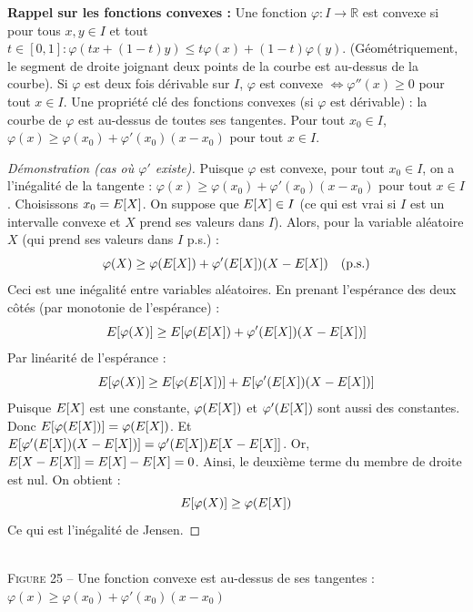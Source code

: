 \textbf{Rappel sur les fonctions convexes :} Une fonction $\varphi : I \to \mathbb{R}$ est convexe si pour tous $x, y \in I$ et tout $t \in [0, 1] : \varphi(tx + (1-t)y) \le t\varphi(x) + (1-t)\varphi(y)$. (Géométriquement, le segment de droite joignant deux points de la courbe est au-dessus de la courbe). Si $\varphi$ est deux fois dérivable sur $I$, $\varphi$ est convexe $\iff \varphi''(x) \ge 0$ pour tout $x \in I$. Une propriété clé des fonctions convexes (si $\varphi$ est dérivable) : la courbe de $\varphi$ est au-dessus de toutes ses tangentes. Pour tout $x_0 \in I$, $\varphi(x) \ge \varphi(x_0) + \varphi'(x_0)(x - x_0)$ pour tout $x \in I$.

\begin{proof}[Démonstration (cas où $\varphi'$ existe)]
Puisque $\varphi$ est convexe, pour tout $x_0 \in I$, on a l'inégalité de la tangente : $\varphi(x) \ge \varphi(x_0) + \varphi'(x_0)(x - x_0)$ pour tout $x \in I$. Choisissons $x_0 = E[X]$. On suppose que $E[X] \in I$ (ce qui est vrai si $I$ est un intervalle convexe et $X$ prend ses valeurs dans $I$). Alors, pour la variable aléatoire $X$ (qui prend ses valeurs dans $I$ p.s.) :
\[ \varphi(X) \ge \varphi(E[X]) + \varphi'(E[X])(X - E[X]) \quad \text{(p.s.)} \]
Ceci est une inégalité entre variables aléatoires. En prenant l'espérance des deux côtés (par monotonie de l'espérance) :
\[ E[\varphi(X)] \ge E[\varphi(E[X]) + \varphi'(E[X])(X - E[X])] \]
Par linéarité de l'espérance :
\[ E[\varphi(X)] \ge E[\varphi(E[X])] + E[\varphi'(E[X])(X - E[X])] \]
Puisque $E[X]$ est une constante, $\varphi(E[X])$ et $\varphi'(E[X])$ sont aussi des constantes. Donc $E[\varphi(E[X])] = \varphi(E[X])$. Et $E[\varphi'(E[X])(X - E[X])] = \varphi'(E[X])E[X - E[X]]$. Or, $E[X - E[X]] = E[X] - E[X] = 0$. Ainsi, le deuxième terme du membre de droite est nul. On obtient :
\[ E[\varphi(X)] \ge \varphi(E[X]) \]
Ce qui est l'inégalité de Jensen.
\end{proof}

\begin{center}
\\[0.5em]
\textsc{Figure 25} – Une fonction convexe est au-dessus de ses tangentes : $\varphi(x) \ge \varphi(x_0) + \varphi'(x_0)(x - x_0)$
\end{center}

